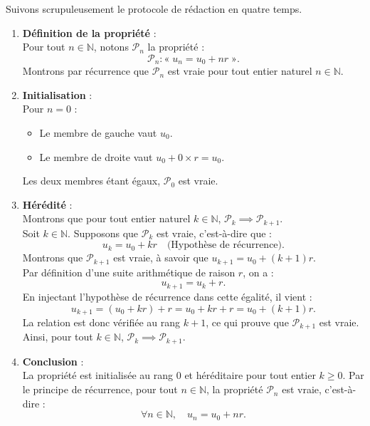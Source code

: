 \documentclass[11pt,a4paper]{article}
\newcommand{\N}{\mathbb{N}}
\begin{document}
\begin{correctionbox}
Suivons scrupuleusement le protocole de rédaction en quatre temps.

\begin{enumerate}[label=\textbf{\arabic*.}]
    \item \textbf{Définition de la propriété} :\\
    Pour tout $n \in \N$, notons $\mathcal{P}_n$ la propriété :
    \[
    \mathcal{P}_n : « \; u_n = u_0 + nr \; ».
    \]
    Montrons par récurrence que $\mathcal{P}_n$ est vraie pour tout entier naturel $n \in \N$.

    \item \textbf{Initialisation} :\\
    Pour $n = 0$ :
    \begin{itemize}
        \item Le membre de gauche vaut $u_0$.
        \item Le membre de droite vaut $u_0 + 0 \times r = u_0$.
    \end{itemize}
    Les deux membres étant égaux, $\mathcal{P}_0$ est vraie.

    \item \textbf{Hérédité} :\\
    Montrons que pour tout entier naturel $k \in \N$, $\mathcal{P}_k \implies \mathcal{P}_{k+1}$.\\
    Soit $k \in \N$. Supposons que $\mathcal{P}_k$ est vraie, c'est-à-dire que :
    \[
    u_k = u_0 + kr \quad \text{(Hypothèse de récurrence)}.
    \]
    Montrons que $\mathcal{P}_{k+1}$ est vraie, à savoir que $u_{k+1} = u_0 + (k+1)r$.\\
    Par définition d'une suite arithmétique de raison $r$, on a :
    \[
    u_{k+1} = u_k + r.
    \]
    En injectant l'hypothèse de récurrence dans cette égalité, il vient :
    \[
    u_{k+1} = (u_0 + kr) + r = u_0 + kr + r = u_0 + (k+1)r.
    \]
    La relation est donc vérifiée au rang $k+1$, ce qui prouve que $\mathcal{P}_{k+1}$ est vraie.\\
    Ainsi, pour tout $k \in \N$, $\mathcal{P}_k \implies \mathcal{P}_{k+1}$.

    \item \textbf{Conclusion} :\\
    La propriété est initialisée au rang $0$ et héréditaire pour tout entier $k \ge 0$. Par le principe de récurrence, pour tout $n \in \N$, la propriété $\mathcal{P}_n$ est vraie, c'est-à-dire :
    \[
    \forall n \in \N, \quad u_n = u_0 + nr.
    \]
\end{enumerate}
\end{correctionbox}
\end{document}
